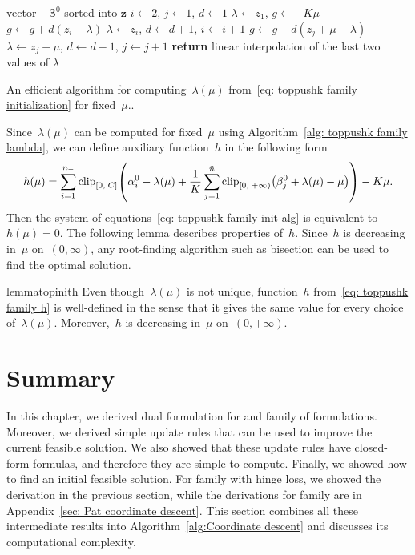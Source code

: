 \begin{algorithm}
  \centering
  \begin{algorithmic}[1]
    \Require vector $-\bm{\beta}^0$ sorted into $\bm{z}$
    \State $i \gets 2$, $j \gets 1$, $d \gets 1$
    \State $\lambda \gets z_1$, $g \gets - K\mu$
        \State $g \gets g + d(z_i - \lambda)$
        \State $\lambda\gets z_i$, $d \gets d+1$, $i \gets i+1$
      \Else
        \State $g \gets g + d(z_j + \mu - \lambda)$
        \State $\lambda \gets z_j + \mu$, $d \gets d - 1$, $j \gets j + 1$
      \EndIf
    \EndWhile
    \State \textbf{return} linear interpolation of the last two values of $\lambda$
  \end{algorithmic}
  \caption{An efficient algorithm for computing~$\lambda(\mu)$ from~\eqref{eq: toppushk family initialization} for fixed~$\mu.$.}
  \label{alg: toppushk family lambda}
\end{algorithm}

Since~$\lambda(\mu)$ can be computed for fixed~$\mu$ using Algorithm~\ref{alg: toppushk family lambda}, we can define auxiliary function~$h$ in the following form
\begin{equation}\label{eq: toppushk family h}
  h(\mu)
    = \sum_{i=1}^{\npos} \clip{0}{C}{\alpha_i^0 - \lambda(\mu) + \frac{1}{K} \sum_{j=1}^{\ntil} \clip[u]{0}{+\infty}{\beta_j^0+\lambda(\mu) - \mu}} - K \mu.
\end{equation}
Then the system of equations~\eqref{eq: toppushk family init alg} is equivalent to~$h(\mu) = 0.$ The following lemma describes properties of~$h.$ Since~$h$ is decreasing in~$\mu$ on~$(0, \infty)$, any root-finding algorithm such as bisection can be used to find the optimal solution.

\begin{restatable}{lemma}{topinith}\label{lemma: toppushk family h}
  Even though~$\lambda(\mu)$ is not unique, function~$h$ from~\eqref{eq: toppushk family h} is well-defined in the sense that it gives the same value for every choice of~$\lambda(\mu)$. Moreover,~$h$ is decreasing in~$\mu$ on~$(0, + \infty)$.
\end{restatable}

\section{Summary}

In this chapter, we derived dual formulation for \TopPushK and \PatMat family of formulations. Moreover, we derived simple update rules that can be used to improve the current feasible solution. We also showed that these update rules have closed-form formulas, and therefore they are simple to compute. Finally, we showed how to find an initial feasible solution. For \TopPushK family with hinge loss, we showed the derivation in the previous section, while the derivations for \PatMat family are in Appendix~\ref{sec: Pat coordinate descent}. This section combines all these intermediate results into Algorithm~\ref{alg:Coordinate descent} and discusses its computational complexity.

